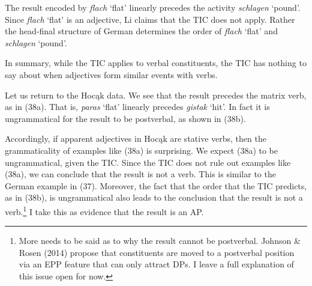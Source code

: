 \documentclass[output=paper]{LSP/langsci}
\begin{document}
The result encoded by \textit{flach} `flat' linearly precedes the activity \textit{schlagen} `pound'. Since \textit{flach} `flat' is an adjective, Li claims that the TIC does not apply. Rather the head-final structure of German determines the order of \textit{flach} `flat' and \textit{schlagen} `pound'. 

In summary, while the TIC applies to verbal constituents, the TIC has nothing to say about when adjectives form similar events with verbs.

Let us return to the Hocąk data. We see that the result precedes the matrix verb, as in (38a). That is, \textit{paras} `flat' linearly precedes \textit{gistak} `hit'. In fact it is ungrammatical for the result to be postverbal, as shown in (38b).

\begin{exe}
\ex
\begin{xlist}



\end{xlist}
\end{exe}

Accordingly, if apparent adjectives in Hocąk are stative verbs, then the grammaticality of examples like (38a) is surprising. We expect (38a) to be ungrammatical, given the TIC. Since the TIC does not rule out examples like (38a), we can conclude that the result is not a verb. This is similar to the German example in (37). Moreover, the fact that the order that the TIC predicts, as in (38b), is ungrammatical also leads to the conclusion that the result is not a verb.\footnote{More needs to be said as to why the result cannot be postverbal. Johnson \& Rosen (2014) propose that constituents are moved to a postverbal position via an EPP feature that can only attract DPs. I leave a full explanation of this issue open for now.} I take this as evidence that the result is an AP.
\end{document}
